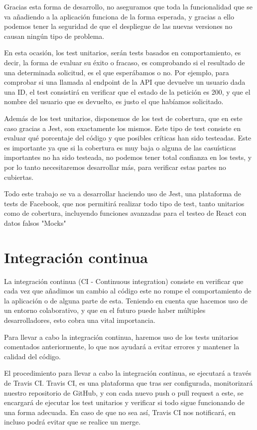Gracias esta forma de desarrollo, no aseguramos que toda la funcionalidad que se va añadiendo a la aplicación funciona de la forma esperada, y gracias a ello podemos tener la seguridad de que el despliegue de las nuevas versiones no causan ningún tipo de problema.

En esta ocasión, los test unitarios, serán tests basados en comportamiento, es decir, la forma de evaluar su éxito o fracaso, es comprobando si el resultado de una determinada solicitud, es el que esperábamos o no. Por ejemplo, para comprobar si una llamada al \gls{endpoint} de la API que devuelve un usuario dada una ID, el test consistirá en verificar que el estado de la petición es 200, y que el nombre del usuario que es devuelto, es justo el que habíamos solicitado.


Además de los test unitarios, disponemos de los test de cobertura, que en este caso gracias a Jest, son exactamente los mismos. Este tipo de test consiste en evaluar qué porcentaje del código y que posibles críticas han sido testeadas. Este es importante ya que si la cobertura es muy baja o alguna de las casuísticas importantes no ha sido testeada, no podemos tener total confianza en los tests, y por lo tanto necesitaremos desarrollar más, para verificar estas partes no cubiertas.

Todo este trabajo se va a desarrollar haciendo uso de Jest, una plataforma de tests de Facebook, que nos permitirá realizar todo tipo de test, tanto unitarios como de cobertura, incluyendo funciones avanzadas para el testeo de React con datos falsos "Mocks"


\section {Integración continua}


La integración continua (CI - Continuous integration) consiste en verificar que cada vez que añadimos un cambio al código este no rompe el comportamiento de la aplicación o de alguna parte de esta. Teniendo en cuenta que hacemos uso de un entorno colaborativo, y que en el futuro puede haber múltiples desarrolladores, esto cobra una vital importancia.

Para llevar a cabo la integración continua, haremos uso de los tests unitarios comentados anteriormente, lo que nos ayudará a evitar errores y mantener la calidad del código.

El procedimiento para llevar a cabo la integración continua, se ejecutará a través de Travis CI. Travis CI, es una plataforma que tras ser configurada, monitorizará nuestro repositorio de GitHub, y con cada nuevo push o \gls{pull request} a este, se encargará de ejecutar los test unitarios y verificar si todo sigue funcionando de una forma adecuada. En caso de que no sea así, Travis CI nos notificará, en incluso podrá evitar que se realice un \gls{merge}.


